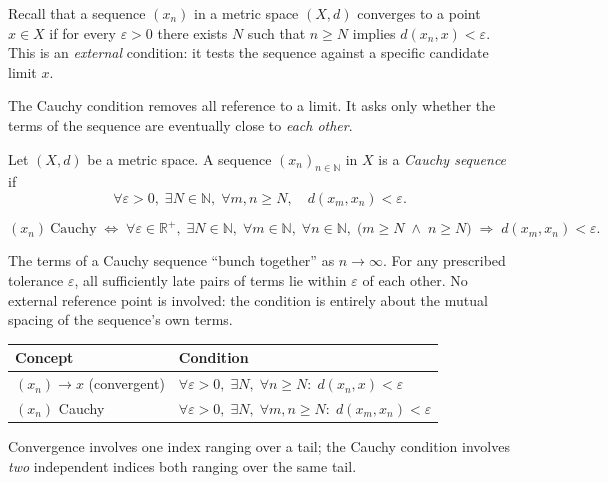 Recall that a sequence $(x_n)$ in a metric space $(X,d)$ converges to a
point $x \in X$ if for every $\varepsilon > 0$ there exists $N$ such that
$n \ge N$ implies $d(x_n, x) < \varepsilon$.
This is an \emph{external} condition: it tests the sequence against a
specific candidate limit $x$.

The Cauchy condition removes all reference to a limit.
It asks only whether the terms of the sequence are eventually close to
\emph{each other}.

\begin{tcolorbox}[colback=propbox, colframe=propborder, arc=2pt,
  left=6pt, right=6pt, top=4pt, bottom=4pt,
  title={\small\textbf{Definition (Cauchy Sequence)}},
  fonttitle=\small\bfseries]
\begin{definition}
\label{def:cauchy-sequence}
Let $(X,d)$ be a metric space.
A sequence $(x_n)_{n\in\mathbb{N}}$ in $X$ is a \emph{Cauchy sequence} if
\[
  \forall \varepsilon > 0,\;
  \exists N \in \mathbb{N},\;
  \forall m,n \ge N,\quad
  d(x_m, x_n) < \varepsilon.
\]
\end{definition}
\end{tcolorbox}

\begin{remark*}
\[
(x_n)\ \text{Cauchy}
\;\iff\;
\forall \varepsilon \in \mathbb{R}^{+},\;
\exists N \in \mathbb{N},\;
\forall m \in \mathbb{N},\;
\forall n \in \mathbb{N},\;
\bigl(m \ge N \;\land\; n \ge N\bigr)
\;\Rightarrow\;
d(x_m, x_n) < \varepsilon.
\]
\end{remark*}

\begin{remark*}[Intuition]
The terms of a Cauchy sequence ``bunch together'' as $n \to \infty$.
For any prescribed tolerance $\varepsilon$, all sufficiently late
pairs of terms lie within $\varepsilon$ of each other.
No external reference point is involved: the condition is entirely
about the mutual spacing of the sequence's own terms.
\end{remark*}

\begin{remark*}
\begin{center}
\begin{tabular}{l l}
\toprule
\textbf{Concept} & \textbf{Condition} \\
\midrule
$(x_n) \to x$ (convergent)
  & $\forall\varepsilon>0,\;\exists N,\;\forall n\ge N:\;
    d(x_n,x) < \varepsilon$ \\[4pt]
$(x_n)$ Cauchy
  & $\forall\varepsilon>0,\;\exists N,\;\forall m,n\ge N:\;
    d(x_m,x_n) < \varepsilon$ \\
\bottomrule
\end{tabular}
\end{center}
\smallskip\noindent
Convergence involves one index ranging over a tail; the Cauchy condition
involves \emph{two} independent indices both ranging over the same tail.
\end{remark*}

